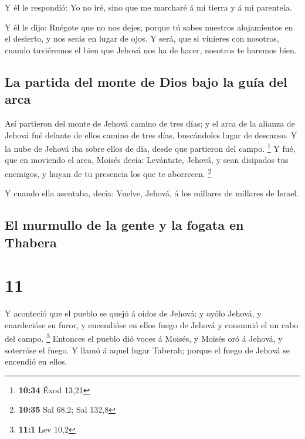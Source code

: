 Y él le respondió: Yo no iré, sino que me marcharé á mi
tierra y á mi parentela.

 Y él le dijo: Ruégote que no nos dejes; porque tú sabes
nuestros alojamientos en el desierto, y nos serás en lugar de ojos.
 Y será, que si vinieres con nosotros, cuando tuviéremos el
bien que Jehová nos ha de hacer, nosotros te haremos bien.

\hypertarget{la-partida-del-monte-de-dios-bajo-la-guuxeda-del-arca}{%
\subsection{La partida del monte de Dios bajo la guía del
arca}\label{la-partida-del-monte-de-dios-bajo-la-guuxeda-del-arca}}

 Así partieron del monte de Jehová camino de tres días; y
el arca de la alianza de Jehová fué delante de ellos camino de tres
días, buscándoles lugar de descanso.  Y la nube de Jehová
iba sobre ellos de día, desde que partieron del campo. \footnote{\textbf{10:34}
  Éxod 13,21}  Y fué, que en moviendo el arca, Moisés
decía: Levántate, Jehová, y sean disipados tus enemigos, y huyan de tu
presencia los que te aborrecen. \footnote{\textbf{10:35} Sal 68,2; Sal
  132,8}

 Y cuando ella asentaba, decía: Vuelve, Jehová, á los
millares de millares de Israel.

\hypertarget{el-murmullo-de-la-gente-y-la-fogata-en-thabera}{%
\subsection{El murmullo de la gente y la fogata en
Thabera}\label{el-murmullo-de-la-gente-y-la-fogata-en-thabera}}

\hypertarget{section-10}{%
\section{11}\label{section-10}}

 Y aconteció que el pueblo se quejó á oídos de Jehová: y
oyólo Jehová, y enardecióse su furor, y encendióse en ellos fuego de
Jehová y consumió el un cabo del campo. \footnote{\textbf{11:1} Lev 10,2}
 Entonces el pueblo dió voces á Moisés, y Moisés oró á
Jehová, y soterróse el fuego.  Y llamó á aquel lugar
Taberah; porque el fuego de Jehová se encendió en ellos.

